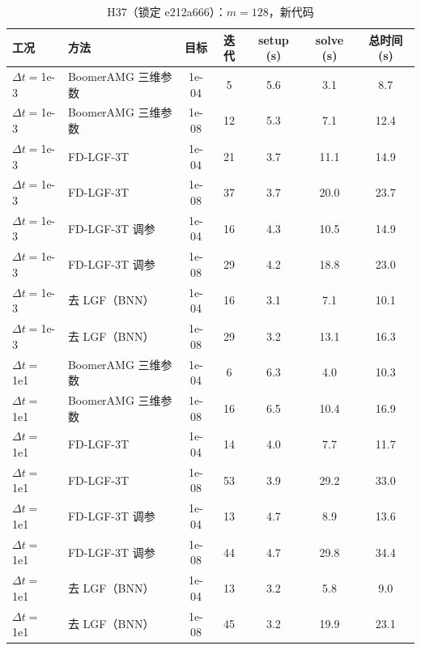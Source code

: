 \begin{table}[H]\centering\small
\caption{H37（锁定 e212a666）：$m=128$，新代码}\label{tab:h37}
\begin{tabular}{llccccc}
\toprule
工况 & 方法 & 目标 & 迭代 & setup (s) & solve (s) & 总时间 (s) \\
\midrule
$\Delta t=$1e-3 & BoomerAMG 三维参数 & 1e-04 & 5 & 5.6 & 3.1 & 8.7 \\
$\Delta t=$1e-3 & BoomerAMG 三维参数 & 1e-08 & 12 & 5.3 & 7.1 & 12.4 \\
$\Delta t=$1e-3 & FD-LGF-3T & 1e-04 & 21 & 3.7 & 11.1 & 14.9 \\
$\Delta t=$1e-3 & FD-LGF-3T & 1e-08 & 37 & 3.7 & 20.0 & 23.7 \\
$\Delta t=$1e-3 & FD-LGF-3T 调参 & 1e-04 & 16 & 4.3 & 10.5 & 14.9 \\
$\Delta t=$1e-3 & FD-LGF-3T 调参 & 1e-08 & 29 & 4.2 & 18.8 & 23.0 \\
$\Delta t=$1e-3 & 去 LGF（BNN） & 1e-04 & 16 & 3.1 & 7.1 & 10.1 \\
$\Delta t=$1e-3 & 去 LGF（BNN） & 1e-08 & 29 & 3.2 & 13.1 & 16.3 \\
$\Delta t=$1e1 & BoomerAMG 三维参数 & 1e-04 & 6 & 6.3 & 4.0 & 10.3 \\
$\Delta t=$1e1 & BoomerAMG 三维参数 & 1e-08 & 16 & 6.5 & 10.4 & 16.9 \\
$\Delta t=$1e1 & FD-LGF-3T & 1e-04 & 14 & 4.0 & 7.7 & 11.7 \\
$\Delta t=$1e1 & FD-LGF-3T & 1e-08 & 53 & 3.9 & 29.2 & 33.0 \\
$\Delta t=$1e1 & FD-LGF-3T 调参 & 1e-04 & 13 & 4.7 & 8.9 & 13.6 \\
$\Delta t=$1e1 & FD-LGF-3T 调参 & 1e-08 & 44 & 4.7 & 29.8 & 34.4 \\
$\Delta t=$1e1 & 去 LGF（BNN） & 1e-04 & 13 & 3.2 & 5.8 & 9.0 \\
$\Delta t=$1e1 & 去 LGF（BNN） & 1e-08 & 45 & 3.2 & 19.9 & 23.1 \\
\bottomrule
\end{tabular}
\end{table}

